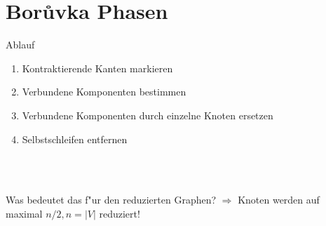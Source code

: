 \documentclass[10pt]{beamer}
\newcommand{\gap}{\ \\ \ \\}
\begin{document}
\section{Bor\r uvka Phasen}
\begin{frame}{Ablauf}
    \begin{enumerate}
        \item Kontraktierende Kanten markieren
        \item Verbundene Komponenten bestimmen
        \item Verbundene Komponenten durch einzelne Knoten ersetzen
        \item Selbstschleifen entfernen
    \end{enumerate}
    \gap
    \begin{block}{Was bedeutet das f"ur den reduzierten Graphen?}
    $\Rightarrow$ Knoten werden auf maximal $n/2, n = |V|$ reduziert!\\
    \end{block}
\end{frame}
\end{document}
